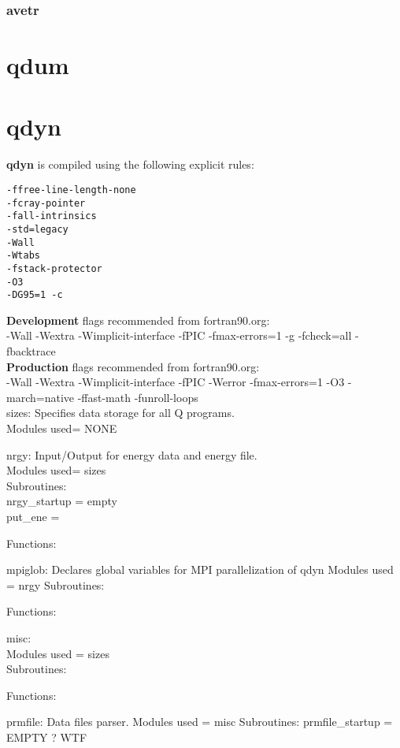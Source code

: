 \documentclass[10pt, oneside, pdftex]{article}
\begin{document}
\subsubsection{avetr} 



\section{qdum}
\label{qdum}


\section{qdyn}
\label{qdyn}
\textbf{qdyn} is compiled using the following explicit rules:
\begin{Verbatim}
-ffree-line-length-none
-fcray-pointer
-fall-intrinsics
-std=legacy
-Wall
-Wtabs
-fstack-protector
-O3
-DG95=1 -c
\end{Verbatim}

\textbf{Development} flags recommended from fortran90.org:\\
-Wall -Wextra -Wimplicit-interface -fPIC -fmax-errors=1 -g -fcheck=all -fbacktrace\\

\textbf{Production} flags recommended from fortran90.org:\\
-Wall -Wextra -Wimplicit-interface -fPIC -Werror -fmax-errors=1 -O3 -march=native -ffast-math -funroll-loops\\

sizes: Specifies data storage for all Q programs.\\
Modules used= NONE

nrgy: Input/Output for energy data and energy file.\\
Modules used= sizes\\
Subroutines:\\
  nrgy\_startup = empty\\
  put\_ene =

Functions:

mpiglob: Declares global variables for MPI parallelization of qdyn
Modules used = nrgy
Subroutines:

Functions:


misc:\\
Modules used = sizes\\
Subroutines:

Functions:


prmfile: Data files parser.
Modules used = misc
Subroutines:
  prmfile\_startup = EMPTY ? WTF
\end{document}
